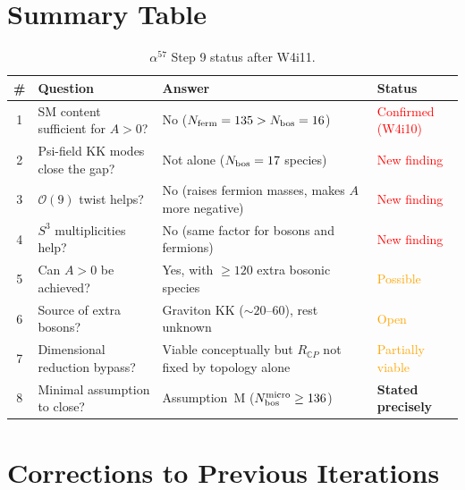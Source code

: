 \documentclass[11pt,a4paper]{article}
\newcommand{\CP}{\mathbb{C}P}
\newcommand{\Nbos}{N_{\rm bos}}
\newcommand{\Nferm}{N_{\rm ferm}}
\begin{document}
\section{Summary Table}
\label{sec:summary-table}

\begin{table}[H]
\centering
\small
\caption{$\alpha^{57}$ Step 9 status after W4i11.}
\begin{tabular}{clll}
\toprule
\textbf{\#} & \textbf{Question} & \textbf{Answer} & \textbf{Status} \\
\midrule
1 & SM content sufficient for $A > 0$?
  & No ($\Nferm = 135 > \Nbos = 16$) & \textcolor{red}{Confirmed (W4i10)} \\
2 & Psi-field KK modes close the gap?
  & Not alone ($\Nbos = 17$ species) & \textcolor{red}{New finding} \\
3 & $\mathcal{O}(9)$ twist helps?
  & No (raises fermion masses, makes $A$ more negative)
  & \textcolor{red}{New finding} \\
4 & $S^3$ multiplicities help?
  & No (same factor for bosons and fermions)
  & \textcolor{red}{New finding} \\
5 & Can $A > 0$ be achieved?
  & Yes, with $\geq 120$ extra bosonic species
  & \textcolor{orange}{Possible} \\
6 & Source of extra bosons?
  & Graviton KK ($\sim 20$--$60$), rest unknown
  & \textcolor{orange}{Open} \\
7 & Dimensional reduction bypass?
  & Viable conceptually but $R_{\CP}$ not fixed by topology alone
  & \textcolor{orange}{Partially viable} \\
8 & Minimal assumption to close?
  & Assumption~M ($\Nbos^{\rm micro} \geq 136$)
  & \textcolor{green!60!black}{\textbf{Stated precisely}} \\
\bottomrule
\end{tabular}
\end{table}


\section{Corrections to Previous Iterations}
\label{sec:corrections}
\end{document}
